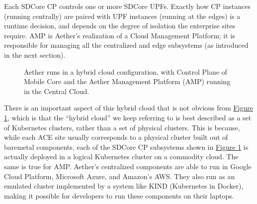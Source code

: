 \documentclass[a4paper,11pt,english]{sphinxmanual}
\let\sphinxpxdimen\pdfpxdimen\else\newdimen\sphinxpxdimen
\begin{document}
\sphinxAtStartPar
Each SD\sphinxhyphen{}Core CP controls one or more SD\sphinxhyphen{}Core UPFs. Exactly how CP
instances (running centrally) are paired with UPF instances (running
at the edges) is a runtime decision, and depends on the degree of
isolation the enterprise sites require. AMP is Aether’s realization of
a Cloud Management Platform; it is responsible for managing all the
centralized and edge subsystems (as introduced in the next section).

\begin{figure}[ht]
\centering
\capstart

\noindent\sphinxincludegraphics[width=600\sphinxpxdimen]{{Slide61}.png}
\caption{Aether runs in a hybrid cloud configuration, with Control Plane of
Mobile Core and the Aether Management Platform (AMP) running in the
Central Cloud.}\label{\detokenize{cloud:id3}}\label{\detokenize{cloud:fig-aether}}\end{figure}

\sphinxAtStartPar
There is an important aspect of this hybrid cloud that is not obvious
from \hyperref[\detokenize{cloud:fig-aether}]{Figure \ref{\detokenize{cloud:fig-aether}}}, which is that the “hybrid
cloud” we keep referring to is best described as a set of Kubernetes
clusters, rather than a set of physical clusters. This is because,
while each ACE site usually corresponds to a physical cluster built
out of bare\sphinxhyphen{}metal components, each of the SD\sphinxhyphen{}Core CP subsystems shown
in \hyperref[\detokenize{cloud:fig-aether}]{Figure \ref{\detokenize{cloud:fig-aether}}} is actually deployed in a logical
Kubernetes cluster on a commodity cloud. The same is true for
AMP. Aether’s centralized components are able to run in Google Cloud
Platform, Microsoft Azure, and Amazon’s AWS. They also run as an
emulated cluster implemented by a system like KIND (Kubernetes in
Docker), making it possible for developers to run these components on
their laptops.
\end{document}
